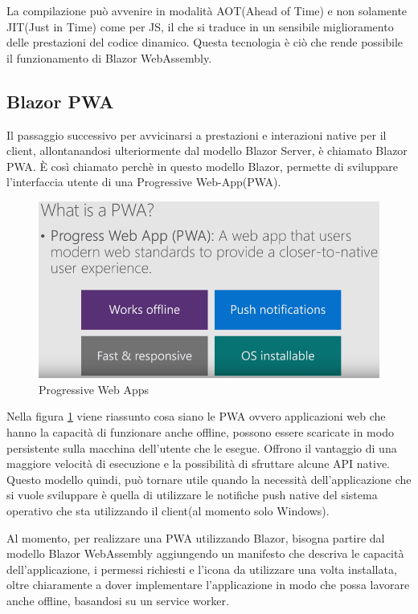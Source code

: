 La compilazione pu\`o avvenire in modalit\`a AOT(Ahead of Time) e non solamente JIT(Just in Time) come per JS, il che si traduce in un sensibile miglioramento delle prestazioni del codice dinamico.
Questa tecnologia \`e ci\`o che rende possibile il funzionamento di Blazor WebAssembly.

\subsection{Blazor PWA}\label{sez:bpwa}
Il passaggio successivo per avvicinarsi a prestazioni e interazioni native per il client, allontanandosi ulteriormente dal modello Blazor Server, \`e chiamato Blazor PWA.
\`E cos\`i chiamato perch\`e in questo modello Blazor, permette di sviluppare l'interfaccia utente di una Progressive Web-App(PWA).

\begin{figure}[H]
	\centerline{\includegraphics[scale=0.5]{figure/ProgressiveWebApp.png}}
	\caption{Progressive Web Apps}
	\label{fig:WhatIsAPWA}
\end{figure}

Nella figura \ref{fig:WhatIsAPWA} viene riassunto cosa siano le PWA ovvero applicazioni web che hanno la capacit\`a di funzionare anche offline, possono essere scaricate in modo persistente sulla macchina dell'utente che le esegue.
Offrono il vantaggio di una maggiore velocit\`a di esecuzione e la possibilit\`a di sfruttare alcune API native.
Questo modello quindi, pu\`o tornare utile quando la necessit\`a dell'applicazione che si vuole sviluppare \`e quella di utilizzare le notifiche push native del sistema operativo che sta utilizzando il client(al momento solo Windows).

Al momento, per realizzare una PWA utilizzando Blazor, bisogna partire dal modello Blazor WebAssembly aggiungendo un manifesto che descriva le capacit\`a dell'applicazione, i permessi richiesti e l'icona da utilizzare una volta installata, oltre chiaramente a dover implementare l'applicazione in modo che possa lavorare anche offline, basandosi su un service worker\cite{blazorPWA}.

